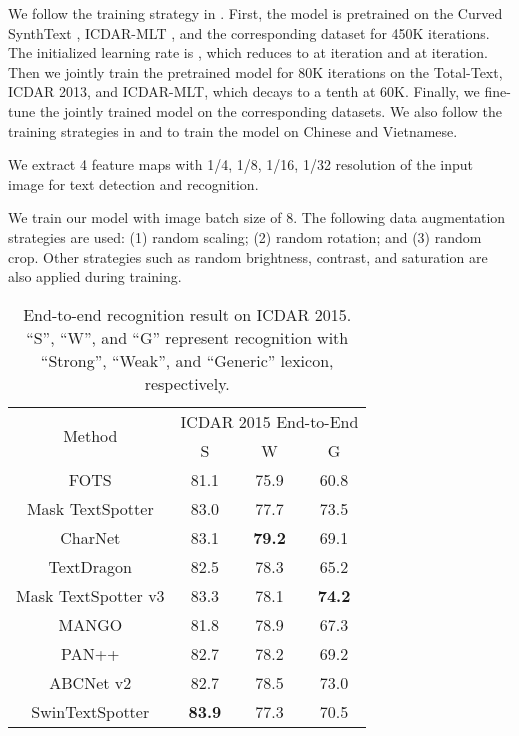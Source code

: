\documentclass[10pt,twocolumn,letterpaper]{article}
\begin{document}
We follow the training strategy in \cite{qiao2021mango}. First, the model is pretrained on the Curved SynthText \cite{liu2020abcnet}, ICDAR-MLT \cite{nayef2017icdar2017}, and the corresponding dataset for 450K iterations. The initialized learning rate is , which reduces to  at  iteration and  at  iteration. Then we jointly train the pretrained model for 80K iterations on the Total-Text, ICDAR 2013, and ICDAR-MLT, which decays to a tenth at 60K. Finally, we fine-tune the jointly trained model on the corresponding datasets. We also follow the training strategies in \cite{liu2021abcnetv2} and \cite{m_Nguyen-etal-CVPR21} to train the model on Chinese and Vietnamese.

We extract 4 feature maps with 1/4, 1/8, 1/16, 1/32 resolution of the input image for text detection and recognition. 

We train our model with image batch size of 8. 
The following data augmentation strategies are used:  
(1) random scaling; (2) random rotation; and (3) random crop. 
Other strategies such as random brightness, contrast, and saturation are also applied during training.

\begin{table}[t]
\begin{tabular}{c|ccc}
\hline
\multirow{2}{*}{Method} & \multicolumn{3}{c}{ICDAR 2015 End-to-End}                    \\ \cline{2-4} 
                        & \multicolumn{1}{c|}{S}    & \multicolumn{1}{c|}{W}    & G    \\ \hline
FOTS\cite{liu2018fots}                    & \multicolumn{1}{c|}{81.1} & \multicolumn{1}{c|}{75.9} & 60.8 \\
Mask TextSpotter\cite{liao2019mask}        & \multicolumn{1}{c|}{83.0} & \multicolumn{1}{c|}{77.7} & 73.5 \\
CharNet\cite{xing2019convolutional}                 & \multicolumn{1}{c|}{83.1} & \multicolumn{1}{c|}{\textbf{79.2}} & 69.1 \\
TextDragon\cite{feng2019textdragon}              & \multicolumn{1}{c|}{82.5} & \multicolumn{1}{c|}{78.3} & 65.2 \\
Mask TextSpotter v3\cite{liao2020mask}     & \multicolumn{1}{c|}{83.3} & \multicolumn{1}{c|}{78.1} & \textbf{74.2} \\
MANGO\cite{qiao2021mango}                   & \multicolumn{1}{c|}{81.8} & \multicolumn{1}{c|}{78.9} & 67.3 \\
PAN++\cite{wang2021pan++}                   & \multicolumn{1}{c|}{82.7} & \multicolumn{1}{c|}{78.2} & 69.2 \\
ABCNet v2\cite{liu2021abcnetv2}                & \multicolumn{1}{c|}{82.7} & \multicolumn{1}{c|}{78.5} & 73.0 \\ \hline
SwinTextSpotter         & \multicolumn{1}{c|}{\textbf{83.9}} & \multicolumn{1}{c|}{77.3} & 70.5 \\ \hline
\end{tabular}
\caption{End-to-end recognition result on ICDAR 2015. “S”, “W”, and “G” represent recognition with “Strong”, “Weak”, and “Generic” lexicon, respectively.}
\label{ICDAR 2015 End-to-End recognition result}
\end{table}
\end{document}
